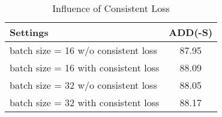 \begin{table}
    \centering
    \caption{Influence of Consistent Loss}
    \begin{tabular}{lc}
    \toprule 
    Settings & ADD(-S) \\
    \midrule
    batch size = 16 w/o consistent loss & 87.95 \\
    batch size = 16 with consistent loss & 88.09 \\
    \midrule
    batch size = 32 w/o consistent loss & 88.05 \\
    batch size = 32 with consistent loss & 88.17 \\
    \bottomrule
  \end{tabular}
  \label{tab:consistent_loss}
\end{table}